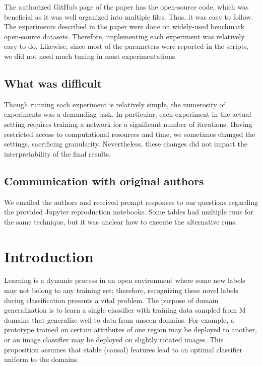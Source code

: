 The authorized GitHub page of the paper has the open-source code, which was beneficial as it was well organized into multiple files. Thus, it was easy to follow. The experiments described in the paper were done on widely-used benchmark open-source datasets. Therefore, implementing each experiment was relatively easy to do. Likewise, since most of the parameters were reported in the scripts, we did not need much tuning in most experimentations. 

\subsection*{What was difficult}

Though running each experiment is relatively simple, the numerosity of experiments was a demanding task. In particular, each experiment in the actual setting requires training a network for a significant number of iterations. Having restricted access to computational resources and time, we sometimes changed the settings, sacrificing granularity. Nevertheless, these changes did not impact the interpretability of the final results.

\subsection*{Communication with original authors}

We emailed the authors and received prompt responses to our questions regarding the provided Jupyter reproduction notebooks. Some tables had multiple runs for the same technique, but it was unclear how to execute the alternative runs.

\section{Introduction}

Learning is a dynamic process in an open environment where some new labels may not belong to any training set; therefore, recognizing these novel labels during classification presents a vital problem. The purpose of domain generalization is to learn a single classifier with training data sampled from M domains that generalize well to data from unseen domains. For example, a prototype trained on certain attributes of one region may be deployed to another, or an image classifier may be deployed on slightly rotated images. This proposition assumes that stable (causal) features lead to an optimal classifier uniform to the domains. 

